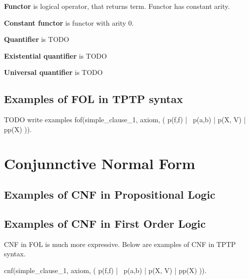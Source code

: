 \textbf{Functor}
is logical operator, that returns term. Functor has constant arity.

\textbf{Constant functor}
is functor with arity 0.

\textbf{Quantifier}
is TODO

\textbf{Existential quantifier}
is TODO

\textbf{Universal quantifier}
is TODO

\subsection{Examples of FOL in TPTP syntax}

\begin{tptpcode}
	TODO write examples
fof(simple_clause_1, axiom,
    ( p(f,f) | ~p(a,b) | p(X, V) | pp(X) )).

\end{tptpcode}

\section{Conjunnctive Normal Form}

\subsection{Examples of CNF in Propositional Logic}

\subsection{Examples of CNF in First Order Logic}

\gls{CNF} in \gls{FOL} is much more expressive. Below are examples of \gls{CNF} in \gls{TPTP} syntax.

\begin{tptpcode}
cnf(simple_clause_1, axiom,
    ( p(f,f) | ~p(a,b) | p(X, V) | pp(X) )).

\end{tptpcode}

